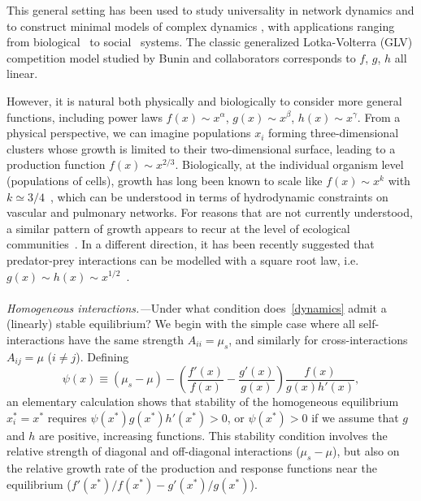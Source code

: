 \documentclass[
 prl,
 twocolumn,
 amsmath,
 amssymb,
 aps,
]{revtex4-2}
\begin{document}
This general setting has been used to study universality in network dynamics \cite{Barzel2013} and to construct minimal models of complex dynamics \cite{Barzel2015}, with applications ranging from biological~\cite{Alon2006,Karlebach2008} 
to social~\cite{Pastor-Satorras2001,Hufnagel2004,Dodds2005} systems.
The classic generalized Lotka-Volterra (GLV) competition model studied by Bunin and collaborators \cite{bunin2017ecological, biroli2018marginally} corresponds to $f$, $g$, $h$ all linear. 

However, it is natural both physically and biologically to consider more general functions, including power laws $f(x)\sim x^\alpha$, $g(x)\sim x^\beta$, $h(x) \sim x^\gamma$.
From a physical perspective, we can imagine populations $x_i$ forming three-dimensional clusters whose growth is limited to their two-dimensional surface, leading to a production function $f(x) \sim x^{2/3}$.
Biologically, at the individual organism level (populations of cells), growth has long been known to scale like $f(x) \sim x^k$ with $k\simeq 3/4$~\cite{Brown2004}, which can be understood in terms of hydrodynamic constraints on vascular and pulmonary networks.
For reasons that are not currently understood, a similar pattern of growth appears to recur at the level of ecological communities~\cite{Hatton2015,Hatton2024}.
In a different direction, it has been recently suggested that predator-prey interactions can be modelled with a square root law, i.e. $g(x) \sim h(x) \sim x^{1/2}$~\cite{Barbier2021,mazzarisi2024}.

\paragraph*{}
\emph{Homogeneous interactions.---}Under what condition does~\eqref{dynamics} admit a (linearly) stable equilibrium? 
We begin with the simple case where all self-interactions have the same strength $A_{ii} = \mu_s$, and similarly for cross-interactions $A_{ij} = \mu$ ($i\neq j$).
Defining 
\begin{equation}
    \psi(x) \equiv (\mu_s - \mu) -  \left(\frac{f'(x)}{f(x)} - \frac{g'(x)}{g(x)}\right)\frac{f(x)}{g(x)h'(x)},
    \label{eq: psi}
\end{equation}
an elementary calculation shows that stability of the homogeneous equilibrium $x_i^* = x^*$ requires $\psi(x^*)g(x^*)h'(x^*) > 0$, or $\psi(x^*)>0$ if we assume that $g$ and $h$ are positive, increasing functions. This stability condition involves the relative strength of diagonal and off-diagonal interactions ($\mu_s - \mu$), but also on the relative growth rate of the production and response functions near the equilibrium ($f'(x^*)/f(x^*) - g'(x^*)/g(x^*)$).
\end{document}
